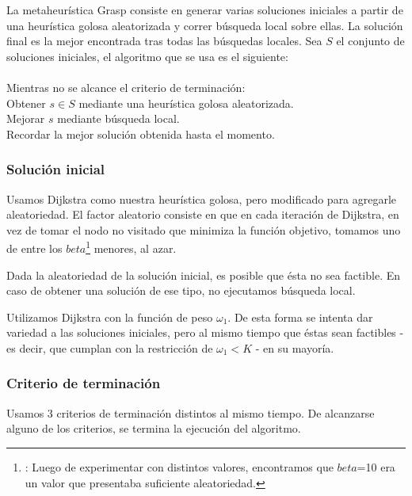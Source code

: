 La metaheurística Grasp consiste en generar varias soluciones iniciales a partir de una heurística golosa aleatorizada y correr búsqueda local sobre ellas. La solución final es la mejor encontrada tras todas las búsquedas locales.
Sea $S$ el conjunto de soluciones iniciales, el algoritmo que se usa es el siguiente:\\\\
\hspace*{1 cm} Mientras no se alcance el criterio de terminación:\\
\hspace*{2 cm} Obtener $s \in S$ mediante una heurística golosa aleatorizada.\\
\hspace*{2 cm} Mejorar $s$ mediante búsqueda local.\\
\hspace*{2 cm} Recordar la mejor solución obtenida hasta el momento.\\
\subsubsection{Solución inicial}

Usamos Dijkstra como nuestra heurística golosa, pero modificado para agregarle aleatoriedad. El factor aleatorio consiste en que en cada iteración de Dijkstra, en vez de tomar el nodo no visitado que minimiza la función objetivo, tomamos uno de entre los $beta$\footnote{\label{$beta$}: Luego de experimentar con distintos valores, encontramos que $beta$=10 era un valor que presentaba suficiente aleatoriedad.} menores, al azar.

Dada la aleatoriedad de la solución inicial, es posible que ésta no sea factible. En caso de obtener una solución de ese tipo, no ejecutamos búsqueda local.

Utilizamos Dijkstra con la función de peso $\omega_1$. De esta forma se intenta dar variedad a las soluciones iniciales, pero al mismo tiempo que éstas sean factibles - es decir, que cumplan con la restricción de $\omega_1 < K$ - en su mayoría.

\subsubsection{Criterio de terminación}

Usamos 3 criterios de terminación distintos al mismo tiempo. De alcanzarse alguno de los criterios, se termina la ejecución del algoritmo.

